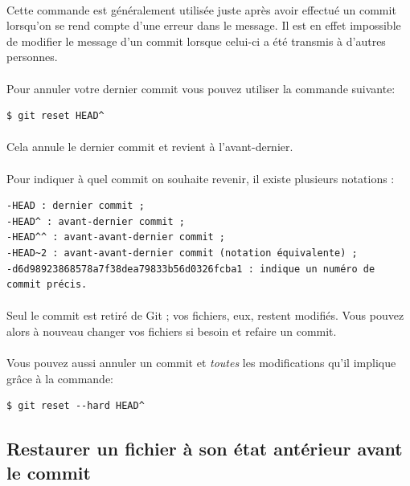 \documentclass[french, a4paper, 12pt, titlepage]{article}
\begin{document}
\paragraph{}Cette commande est généralement utilisée juste après avoir effectué un commit lorsqu’on se rend compte d’une erreur dans le message. Il est en effet impossible de modifier le message d’un commit lorsque celui-ci a été transmis à d’autres personnes.
\paragraph{}Pour annuler votre dernier commit vous pouvez utiliser la commande suivante:
\begin{lstlisting}
$ git reset HEAD^
\end{lstlisting}
\paragraph{}Cela annule le dernier commit et revient à l’avant-dernier.
\paragraph{}Pour indiquer à quel commit on souhaite revenir, il existe plusieurs notations :
\begin{lstlisting}
-HEAD : dernier commit ;
-HEAD^ : avant-dernier commit ;
-HEAD^^ : avant-avant-dernier commit ;
-HEAD~2 : avant-avant-dernier commit (notation équivalente) ;
-d6d98923868578a7f38dea79833b56d0326fcba1 : indique un numéro de commit précis.
\end{lstlisting}
\paragraph{}Seul le commit est retiré de Git ; vos fichiers, eux, restent modifiés. Vous pouvez alors à nouveau changer vos fichiers si besoin et refaire un commit.
\paragraph{}Vous pouvez aussi annuler un commit et \emph{toutes} les modifications qu'il implique grâce à la commande:
\begin{lstlisting}
$ git reset --hard HEAD^
\end{lstlisting}

\subsection{Restaurer un fichier à son état antérieur avant le commit}
\end{document}
